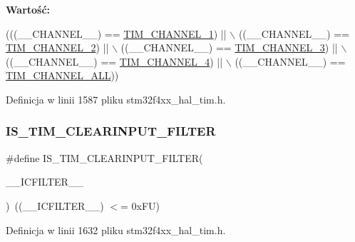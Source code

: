 {\bfseries Wartość\+:}
\begin{DoxyCode}
(((\_\_CHANNEL\_\_) == \hyperlink{group___t_i_m___channel_ga6b1541e4a49d62610899e24bf23f4879}{TIM\_CHANNEL\_1}) || \(\backslash\)
                                            ((\_\_CHANNEL\_\_) == \hyperlink{group___t_i_m___channel_ga33e02d43345a7ac5886f01b39e4f7ccd}{TIM\_CHANNEL\_2}) || \(\backslash\)
                                            ((\_\_CHANNEL\_\_) == \hyperlink{group___t_i_m___channel_ga4ea100c1789b178f3cb46721b7257e2d}{TIM\_CHANNEL\_3}) || \(\backslash\)
                                            ((\_\_CHANNEL\_\_) == \hyperlink{group___t_i_m___channel_gad59ef74820ee8bf77fa1f8d589fde2ac}{TIM\_CHANNEL\_4}) || \(\backslash\)
                                            ((\_\_CHANNEL\_\_) == \hyperlink{group___t_i_m___channel_ga6abf8f9fc695b79d8781ca082dfb48bc}{TIM\_CHANNEL\_ALL}))
\end{DoxyCode}


Definicja w linii 1587 pliku stm32f4xx\+\_\+hal\+\_\+tim.\+h.

\mbox{\label{group___t_i_m___private___macros_gaf8f726fb3929b2fe50099b21eec9a738}} 
\subsubsection{\texorpdfstring{I\+S\+\_\+\+T\+I\+M\+\_\+\+C\+L\+E\+A\+R\+I\+N\+P\+U\+T\+\_\+\+F\+I\+L\+T\+ER}{IS\_TIM\_CLEARINPUT\_FILTER}}
{\footnotesize\ttfamily \#define I\+S\+\_\+\+T\+I\+M\+\_\+\+C\+L\+E\+A\+R\+I\+N\+P\+U\+T\+\_\+\+F\+I\+L\+T\+ER(\begin{DoxyParamCaption}\item[{}]{\+\_\+\+\_\+\+I\+C\+F\+I\+L\+T\+E\+R\+\_\+\+\_\+ }\end{DoxyParamCaption})~((\+\_\+\+\_\+\+I\+C\+F\+I\+L\+T\+E\+R\+\_\+\+\_\+) $<$= 0x\+F\+U)}



Definicja w linii 1632 pliku stm32f4xx\+\_\+hal\+\_\+tim.\+h.

\mbox{\label{group___t_i_m___private___macros_ga0e0cafe2b21ee029a89cba1a400fa21c}} 
